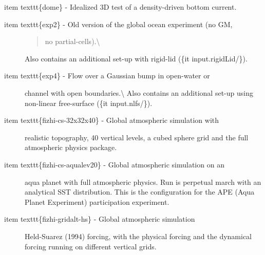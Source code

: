 \documentclass[letterpaper,10pt,english]{sphinxmanual}
\begin{document}
item texttt\{dome\} - Idealized 3D test of a density-driven bottom current.
\begin{description}
\item[{item texttt\{exp2\} - Old version of the global ocean experiment (no GM,}] \leavevmode\begin{quote}

no partial-cells).\textbackslash{}
\end{quote}

Also contains an additional set-up with rigid-lid (\{it input.rigidLid/\}).

\item[{item texttt\{exp4\} - Flow over a Gaussian bump in open-water or}] \leavevmode
channel with open boundaries.\textbackslash{}
Also contains an additional set-up using non-linear free-surface (\{it input.nlfs/\}).

\item[{item texttt\{fizhi-cs-32x32x40\} - Global atmospheric simulation with}] \leavevmode
realistic topography, 40 vertical levels, a cubed sphere grid and
the full atmospheric physics package.

\item[{item texttt\{fizhi-cs-aqualev20\} - Global atmospheric simulation on an}] \leavevmode
aqua planet with full atmospheric physics. Run is perpetual march
with an analytical SST distribution.  This is the configuration for
the APE (Aqua Planet Experiment) participation experiment.

\item[{item texttt\{fizhi-gridalt-hs\} - Global atmospheric simulation}] \leavevmode
Held-Suarez (1994) forcing, with the physical forcing and the
dynamical forcing running on different vertical grids.

\end{description}
\end{document}
